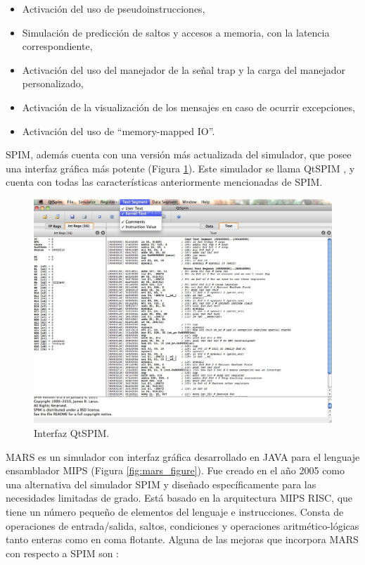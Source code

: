 \begin{itemize}

\item Activación del uso de pseudoinstrucciones,

\item Simulación de predicción de saltos y accesos a memoria, con la latencia correspondiente,

\item Activación del uso del manejador de la señal trap y la carga del manejador personalizado,

\item Activación de la visualización de los mensajes en caso de ocurrir excepciones,

\item Activación del uso de ``memory-mapped IO''.

\end{itemize}

SPIM, además cuenta con una versión más actualizada del simulador, que posee una interfaz gráfica más potente (Figura \ref{fig:qtspim_figure}). Este simulador se llama QtSPIM \cite{aguilar2013simuladores}, y cuenta con todas las características anteriormente mencionadas de SPIM.

\begin{figure}[htbp]
 	\centering
 	\includegraphics[width=12cm]{figures/qtspim_figure}
 	\caption{Interfaz QtSPIM.}
	\label{fig:qtspim_figure}
\end{figure}

MARS \cite{vollmar2006mars} es un simulador con interfaz gráfica desarrollado en JAVA para el lenguaje ensamblador MIPS (Figura \ref{fig:mars_figure}). Fue creado en el año 2005 como una alternativa del simulador SPIM y diseñado específicamente para las necesidades limitadas de grado. Está basado en la arquitectura MIPS RISC, que tiene un número pequeño de elementos del lenguaje e instrucciones. Consta de operaciones de entrada/salida, saltos, condiciones y operaciones aritmético-lógicas tanto enteras como en coma flotante. Alguna de las mejoras que incorpora MARS con respecto a SPIM son \cite{vegdahl2008mipspilot}: 

